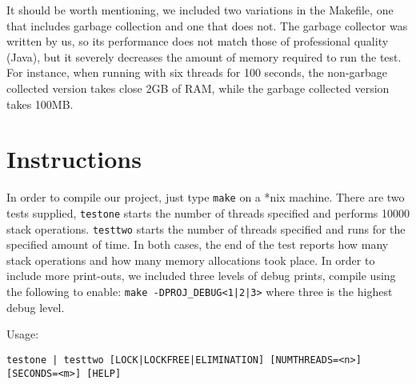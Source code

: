 \documentclass [letterpaper]{article}
\begin{document}
    It should be worth mentioning, we included two variations in the Makefile, one that includes garbage collection and one that does not.
    The garbage collector was written by us, so its performance does not match those of professional quality (Java), but it severely decreases the amount of memory required to run the test.
    For instance, when running with six threads for 100 seconds, the non-garbage collected version takes close 2GB of RAM, while the garbage collected version takes 100MB.

    \section{Instructions}

    In order to compile our project, just type \verb+make+ on a *nix machine.
    There are two tests supplied, \verb+testone+ starts the number of threads specified and performs 10000 stack operations.
    \verb+testtwo+ starts the number of threads specified and runs for the specified amount of time.
    In both cases, the end of the test reports how many stack operations and how many memory allocations took place.
    In order to include more print-outs, we included three levels of debug prints, compile using the following to enable: \verb+make -DPROJ_DEBUG<1|2|3>+ where three is the highest debug level.

    Usage:

    \begin{verbatim}
testone | testtwo [LOCK|LOCKFREE|ELIMINATION] [NUMTHREADS=<n>] [SECONDS=<m>] [HELP]
    \end{verbatim}
\end{document}
